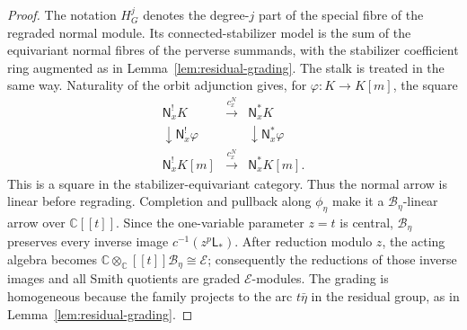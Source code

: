 \documentclass[10pt,a4paper]{amsart}
\newcommand{\C}{\mathbb C}
\newcommand{\A}{\C[[t]]}
\begin{document}
\begin{proof}
The notation $H_G^j$ denotes the degree-$j$ part of the special
fibre of the regraded normal module.  Its connected-stabilizer model is
the sum of the equivariant normal fibres of the perverse summands,
with the stabilizer coefficient ring augmented as in
Lemma~\ref{lem:residual-grading}.  The stalk is treated in the same way.  Naturality of the orbit adjunction gives, for
$\varphi:K\to K[m]$, the square
\[
\begin{array}{ccc}
 \mathsf N_x^!K&\xrightarrow{c_x^N}&\mathsf N_x^*K\\
 \downarrow{\scriptstyle\mathsf N_x^!\varphi}&&
 \downarrow{\scriptstyle\mathsf N_x^*\varphi}\\
 \mathsf N_x^!K[m]&\xrightarrow{c_x^N}&\mathsf N_x^*K[m].
\end{array}
\]
This is a square in the stabilizer-equivariant category.  Thus the
normal arrow is linear before regrading.  Completion and pullback along
$\phi_\eta$ make it a $\mathcal B_\eta$-linear arrow over $\A$.  Since the
one-variable parameter $z=t$ is central, $\mathcal B_\eta$ preserves every inverse
image $c^{-1}(z^p\mathsf L_*)$.  After reduction modulo $z$, the acting
algebra becomes
$\mathbb C\otimes_\A \mathcal B_\eta\cong\mathcal E$; consequently the reductions
of those inverse images and all Smith quotients are graded
$\mathcal E$-modules.  The grading is homogeneous because the family
projects to the arc $t\bar\eta$ in the residual group, as in
Lemma~\ref{lem:residual-grading}.


\end{proof}
\end{document}
